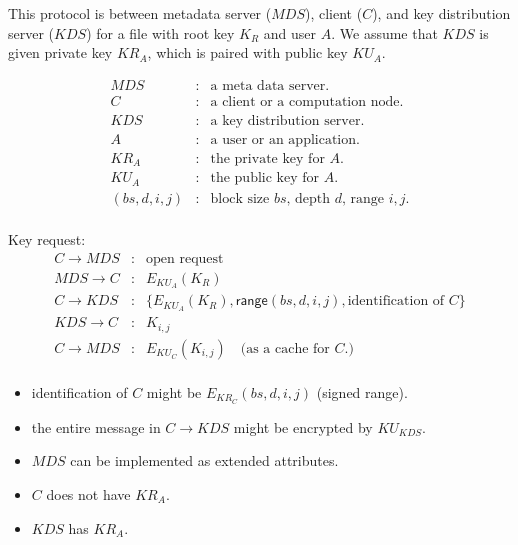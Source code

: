 \documentclass[11pt]{article}
\newcommand{\mds}{\ensuremath{\mathit{MDS}}}
\newcommand{\kds}{\ensuremath{\mathit{KDS}}}
\begin{document}
This protocol is between metadata server ($\mds$), client ($C$), and
key distribution server ($\kds$) for a file with root key $K_R$ and
user $A$.  We assume that \kds\xspace is given private key
$\textit{KR}_A$, which is paired with public key $\textit{KU}_A$.

\begin{eqnarray*}
   \mds & : & \mbox{a meta data server.} \\
   C    & : & \mbox{a client or a computation node.} \\
   \kds & : & \mbox{a key distribution server.} \\
   A    & : & \mbox{a user or an application.} \\
   \textit{KR}_A & : & \mbox{the private key for $A$.} \\
   \textit{KU}_A & : & \mbox{the public key for $A$.} \\
   (bs,d,i,j) & : & \mbox{block size $bs$, depth $d$, range $i,j$.} \\
\end{eqnarray*}

Key request:
\begin{eqnarray*}
  C \rightarrow \mds & : & \mbox{open request} \\
  \mds \rightarrow C & : & E_{KU_A} (K_R) \\
  C \rightarrow \kds & : &
    \{ E_{KU_A} (K_R), \mathsf{range}(bs,d,i,j),
       \mbox{identification of $C$} \} \\
  \kds \rightarrow C & : & K_{i,j} \\
  C \rightarrow \mds & : & E_{KU_C}(K_{i,j})
       \quad \mbox{(as a cache for $C$.)} \\
\end{eqnarray*}

\begin{itemize}
\item identification of $C$ might be $E_{KR_C}(bs,d,i,j)$ (signed range).
\item the entire message in $C \rightarrow \kds$ might be
      encrypted by $KU_{\kds}$.
\item \mds{} can be implemented as extended attributes.
\item $C$ does not have $\textit{KR}_A$.
\item \kds{} has $\textit{KR}_A$.
\end{itemize}
\end{document}
